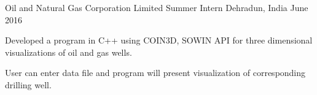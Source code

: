 \vspace{-0.4cm}
\begin{cventries}
\vspace{-0.1cm}
  \cventry
    {Oil and Natural Gas Corporation Limited}
    {Summer Intern}
    {Dehradun, India}
    {June 2016}
    {
      \begin{cvitems}
        \item {\small Developed a program in C++ using COIN3D, SOWIN API  for three dimensional visualizations of oil and gas wells.}
        \item {\small User can enter data file and program will present visualization of corresponding drilling well.}
      \end{cvitems}
    }  
\end{cventries}
